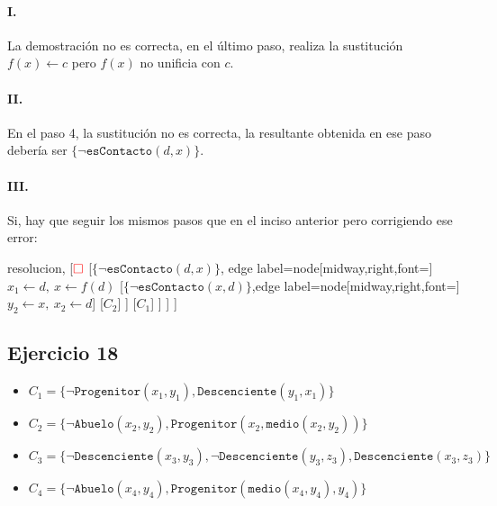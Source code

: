 \documentclass[10pt,a4paper]{article}
\begin{document}
\paragraph{I.} La demostración no es correcta, en el último paso, realiza la sustitución $f(x)\leftarrow c$ pero $f(x)$ no unificia con $c$.

\paragraph{II.} En el paso 4, la sustitución no es correcta, la resultante obtenida en ese paso debería ser $\{\lnot\texttt{esContacto}(d,x)\}$.

\paragraph{III.} Si, hay que seguir los mismos pasos que en el inciso anterior pero corrigiendo ese error:

\begin{center}
	\begin{forest} resolucion,
[${\color{red}\Box}$ 
                	[$\{\lnot\texttt{esContacto}(d \comma x)\}$, edge label={node[midway,right,font=\footnotesize] {$x_1\leftarrow d,~x\leftarrow f(d)$}}
                    	[$\{\lnot \texttt{esContacto}(x\comma d)\}$,edge label={node[midway,right,font=\footnotesize] {$y_2\leftarrow x,~x_2\leftarrow d$}}]
                    	[$C_2$]
                	]
                	[$C_1$]
            	]
        	]
]
	\end{forest}
\end{center}

\subsection{Ejercicio 18}
    \begin{itemize}
        \item $C_1 = \{ \lnot \texttt{Progenitor}(x_1,y_1),\texttt{Descenciente}(y_1,x_1)\}$ 
         \item $C_2 =\{ \lnot \texttt{Abuelo}(x_2,y_2), \texttt{Progenitor}(x_2, \texttt{medio}(x_2,y_2))\}$ 
        \item $C_3 = \{ \lnot \texttt{Descenciente}(x_3,y_3), \lnot \texttt{Descenciente}(y_3,z_3), \texttt{Descenciente}(x_3,z_3)\}$ 
        \item $C_4 =\{ \lnot \texttt{Abuelo}(x_4,y_4), \texttt{Progenitor}(\texttt{medio}(x_4,y_4),y_4)\}$ 
     \end{itemize}
\end{document}
